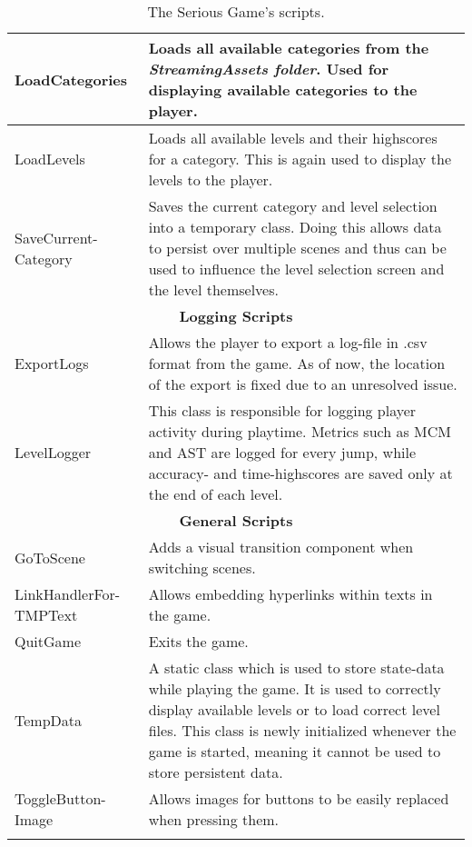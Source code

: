 \documentclass[draft,final]{vutinfth} %
\begin{document}
\begin{longtable}[h]{|p{}|p{}|}
LoadCategories & Loads all available categories from the \emph{StreamingAssets folder}. Used for displaying available categories to the player. \\ \hline
LoadLevels & Loads all available levels and their highscores for a category. This is again used to display the levels to the player. \\ \hline
SaveCurrent-Category & Saves the current category and level selection into a temporary class. Doing this allows data to persist over multiple scenes and thus can be used to influence the level selection screen and the level themselves. \\ \hline
\multicolumn{2}{|c|}{\textbf{Logging Scripts}} \\ \hline
ExportLogs & Allows the player to export a log-file in .csv format from the game. As of now, the location of the export is fixed due to an unresolved issue. \\ \hline
LevelLogger & This class is responsible for logging player activity during playtime. Metrics such as MCM and AST are logged for every jump, while accuracy- and time-highscores are saved only at the end of each level. \\ \hline
\multicolumn{2}{|c|}{\textbf{General Scripts}} \\ \hline
GoToScene & Adds a visual transition component when switching scenes. \\ \hline
LinkHandlerFor-TMPText & Allows embedding hyperlinks within texts in the game. \\ \hline
QuitGame & Exits the game. \\ \hline
TempData & A static class which is used to store state-data while playing the game. It is used to correctly display available levels or to load correct level files. This class is newly initialized whenever the game is started, meaning it cannot be used to store persistent data. \\ \hline
ToggleButton-Image & Allows images for buttons to be easily replaced when pressing them. \\ \hline


\caption{The Serious Game's scripts.}
\label{tbl:gameScripts}
\end{longtable}
\end{document}
